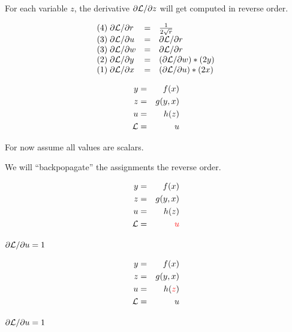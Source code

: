 {\vfill
For each variable $z$, the derivative $\partial {\cal L}/\partial z$ will get computed in reverse order.

\vfill
{\color{red}
$$\begin{array}{lcl}
(4)\; \partial{\cal L}/\partial r & = & \frac{1}{2\sqrt{r}} \\
(3)\; \partial{\cal L}/\partial u & = & \partial {\cal L}/\partial r \\
(3)\; \partial{\cal L}/\partial w & = & \partial {\cal L}/\partial r\\
(2)\; \partial{\cal L}/\partial y & = & (\partial {\cal L}/\partial w) * (2y) \\
(1)\; \partial{\cal L}/\partial x & = & (\partial {\cal L}/\partial u) * (2x)
\end{array}$$
}

\vspace{-3ex}
\begin{eqnarray*}
  y & = & f(x) \\
  z & = & g(y,x) \\
  u & = & h(z) \\
  {\cal L} & = & u
\end{eqnarray*}

\medskip
For now assume all values are scalars.

\medskip
We will ``backpopagate'' the assignments the reverse order.

\vspace{-3ex}
\begin{eqnarray*}
  y & = & f(x) \\
  z & = & g(y,x) \\
  u & = & h(z) \\
  {\cal L} &  = & {\color{red} u}
\end{eqnarray*}

\medskip
{\color{red} ${\partial {\cal L}}/{\partial u} = 1$}

\vspace{-3ex}
\begin{eqnarray*}
  y & = & f(x) \\
  z & = & g(y,x) \\
  u & = & h({\color{red} z}) \\
  {\cal L} &  = &  u
\end{eqnarray*}

\medskip
${\partial {\cal L}}/{\partial u} = 1$

}

